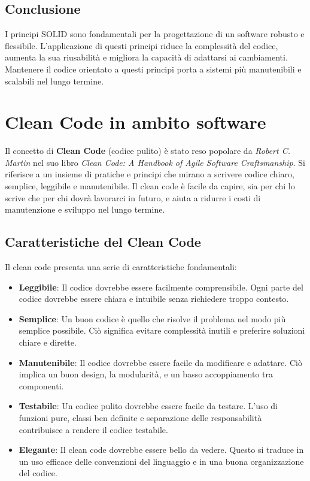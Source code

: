 \documentclass{article}
\begin{document}
\subsection{Conclusione}
I principi SOLID sono fondamentali per la progettazione di un software robusto e flessibile. L'applicazione di questi principi riduce la complessità del codice, aumenta la sua riusabilità e migliora la capacità di adattarsi ai cambiamenti. Mantenere il codice orientato a questi principi porta a sistemi più manutenibili e scalabili nel lungo termine.


\section{Clean Code in ambito software}

Il concetto di \textbf{Clean Code} (codice pulito) è stato reso popolare da \textit{Robert C. Martin} nel suo libro \textit{Clean Code: A Handbook of Agile Software Craftsmanship}. Si riferisce a un insieme di pratiche e principi che mirano a scrivere codice chiaro, semplice, leggibile e manutenibile. Il clean code è facile da capire, sia per chi lo scrive che per chi dovrà lavorarci in futuro, e aiuta a ridurre i costi di manutenzione e sviluppo nel lungo termine.

\subsection{Caratteristiche del Clean Code}
Il clean code presenta una serie di caratteristiche fondamentali:
\begin{itemize}
    \item \textbf{Leggibile}: Il codice dovrebbe essere facilmente comprensibile. Ogni parte del codice dovrebbe essere chiara e intuibile senza richiedere troppo contesto.
    \item \textbf{Semplice}: Un buon codice è quello che risolve il problema nel modo più semplice possibile. Ciò significa evitare complessità inutili e preferire soluzioni chiare e dirette.
    \item \textbf{Manutenibile}: Il codice dovrebbe essere facile da modificare e adattare. Ciò implica un buon design, la modularità, e un basso accoppiamento tra componenti.
    \item \textbf{Testabile}: Un codice pulito dovrebbe essere facile da testare. L'uso di funzioni pure, classi ben definite e separazione delle responsabilità contribuisce a rendere il codice testabile.
    \item \textbf{Elegante}: Il clean code dovrebbe essere bello da vedere. Questo si traduce in un uso efficace delle convenzioni del linguaggio e in una buona organizzazione del codice.
\end{itemize}
\end{document}
